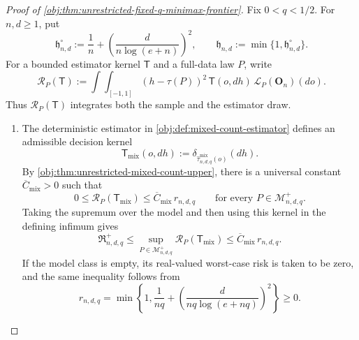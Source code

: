 \documentclass[11pt]{article}
\begin{document}
\begin{proof}[Proof of \cref{obj:thm:unrestricted-fixed-q-minimax-frontier}]
Fix \(0<q<1/2\). For \(n,d\ge1\), put
\[
\mathfrak h_{n,d}^{\circ}
:=
\frac1n+\left(\frac{d}{n\log(e+n)}\right)^2,
\qquad
\mathfrak h_{n,d}:=\min\{1,\mathfrak h_{n,d}^{\circ}\}.
\]
For a bounded estimator kernel \(\mathsf T\) and a full-data law \(P\), write
\[
\mathcal R_P(\mathsf T)
:=
\int\!\int_{[-1,1]}
(h-\tau(P))^2\,\mathsf T(o,dh)\,
\mathcal L_P(\mathbf O_n)(do).
\]
Thus \(\mathcal R_P(\mathsf T)\) integrates both the sample and the estimator draw.

\begin{enumerate}
\item
The deterministic estimator in \cref{obj:def:mixed-count-estimator} defines an admissible decision kernel
\[
\mathsf T_{\mathrm{mix}}(o,dh)
:=
\delta_{\widehat\tau^{\mathrm{mix}}_{n,d,q}(o)}(dh).
\]
By \cref{obj:thm:unrestricted-mixed-count-upper}, there is a universal constant \(\overline C_{\mathrm{mix}}>0\) such that
\[
0\le \mathcal R_P(\mathsf T_{\mathrm{mix}})
\le \overline C_{\mathrm{mix}}\,r_{n,d,q}
\qquad
\text{for every }P\in\mathcal M^+_{n,d,q}.
\]
Taking the supremum over the model and then using this kernel in the defining infimum gives
\[
\mathfrak R^+_{n,d,q}
\le
\sup_{P\in\mathcal M^+_{n,d,q}}
\mathcal R_P(\mathsf T_{\mathrm{mix}})
\le
\overline C_{\mathrm{mix}}\,r_{n,d,q}.
\]
If the model class is empty, its real-valued worst-case risk is taken to be zero, and the same inequality follows from
\[
r_{n,d,q}
=
\min\left\{1,\frac1{nq}
+\left(\frac{d}{nq\log(e+nq)}\right)^2\right\}
\ge0.
\]


\end{enumerate}
\end{proof}
\end{document}
